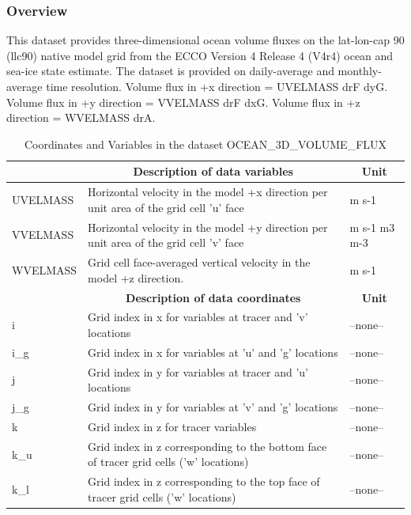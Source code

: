 \subsubsection{Overview}
This dataset provides three-dimensional ocean volume fluxes on the lat-lon-cap 90 (llc90) native model grid from the ECCO Version 4 Release 4 (V4r4) ocean and sea-ice state estimate. The dataset is provided on daily-average and monthly-average time resolution. Volume flux in +x direction = UVELMASS drF dyG. Volume flux in +y direction = VVELMASS drF dxG. Volume flux in +z direction = WVELMASS drA. 
\begin{longtable}{|m{}|m{}|m{}|}
\caption{Coordinates and Variables in the dataset OCEAN\_3D\_VOLUME\_FLUX}
\label{tab:table-OCEAN_3D_VOLUME_FLUX-fields} \\ 
\hline \endhead \hline \endfoot
\rowcolor{lightgray} \multicolumn{1}{|c|}{\textbf{Variables}} & \multicolumn{1}{|c|}{\textbf{Description of data variables}} &  \multicolumn{1}{|c|}{\textbf{Unit}}\\ \hline
UVELMASS &Horizontal velocity in the model +x direction per unit area of the grid cell 'u' face &m s-1  \\ \hline
VVELMASS &Horizontal velocity in the model +y direction per unit area of the grid cell 'v' face &m s-1 m3 m-3  \\ \hline
WVELMASS &Grid cell face-averaged vertical velocity in the model +z direction. &m s-1  \\ \hline
\rowcolor{lightgray} \multicolumn{1}{|c|}{\textbf{Coordinates}} & \multicolumn{1}{|c|}{\textbf{Description of data coordinates}} &  \multicolumn{1}{|c|}{\textbf{Unit}}\\ \hline
i &Grid index in x for variables at tracer and 'v' locations &--none--  \\ \hline
i\_g &Grid index in x for variables at 'u' and 'g' locations &--none--  \\ \hline
j &Grid index in y for variables at tracer and 'u' locations &--none--  \\ \hline
j\_g &Grid index in y for variables at 'v' and 'g' locations &--none--  \\ \hline
k &Grid index in z for tracer variables &--none--  \\ \hline
k\_u &Grid index in z corresponding to the bottom face of tracer grid cells ('w' locations) &--none--  \\ \hline
k\_l &Grid index in z corresponding to the top face of tracer grid cells ('w' locations) &--none--  \\ \hline

\end{longtable}
